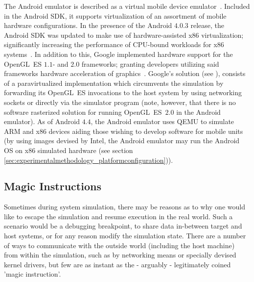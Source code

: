 The Android emulator is described as a virtual mobile device emulator~.
Included in the Android SDK, it supports virtualization of an assortment of mobile hardware configurations.
In the presence of the Android $4.0.3$ release, the Android SDK was updated to make use of hardware-assisted x86 virtualization; significantly increasing the performance of CPU-bound workloads for x86 systems~.
In addition to this, Google implemented hardware support for the OpenGL~ES $1.1$- and $2.0$ frameworks; granting developers utilizing said frameworks hardware acceleration of graphics~.
Google's solution (see ), consists of a paravirtualized implementation which circumvents the simulation by forwarding its OpenGL~ES invocations to the host system by using networking sockets or directly via the simulator program (note, however, that there is no software rasterized solution for running OpenGL~ES~$2.0$ in the Android emulator).
As of Android $4.4$, the Android emulator uses QEMU to simulate ARM and x86 devices aiding those wishing to develop software for mobile units (by using images devised by Intel\circledR, the Android emulator may run the Android OS on x86 simulated hardware (see section \ref{sec:experimentalmethodology_platformconfiguration})).

\subsection{Magic Instructions}
\label{sec:backgroundandrelatedwork_magicinstructions}
Sometimes during system simulation, there may be reasons as to why one would like to escape the simulation and resume execution in the real world.
Such a scenario would be a debugging breakpoint, to share data in-between target and host systems, or for any reason modify the simulation state.
There are a number of ways to communicate with the outside world (including the host machine) from within the simulation, such as by networking means or specially devised kernel drivers, but few are as instant as the - arguably - legitimately coined 'magic instruction'.

